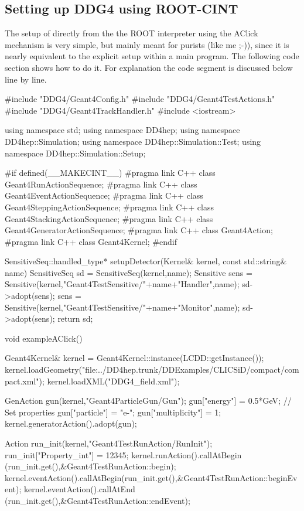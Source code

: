 \documentclass[10pt,a4paper]{article}
\begin{document}
\newpage
\subsection{Setting up DDG4 using ROOT-CINT}
\label{sec:ddg4-implementation-setup-root-cint}

\noindent
The setup of \DDG directly from the the ROOT interpreter using the AClick
mechanism is very simple, but mainly meant for purists (like me ;-)),
since it is nearly equivalent to the explicit setup within a  
main program.
The following code section shows how to do it. For explanation the code
segment is discussed below line by line.
\begin{code}
#include "DDG4/Geant4Config.h"
#include "DDG4/Geant4TestActions.h"
#include "DDG4/Geant4TrackHandler.h"
#include <iostream>

using namespace std;
using namespace DD4hep;
using namespace DD4hep::Simulation;
using namespace DD4hep::Simulation::Test;
using namespace DD4hep::Simulation::Setup;

#if defined(__MAKECINT__)
#pragma link C++ class Geant4RunActionSequence;
#pragma link C++ class Geant4EventActionSequence;
#pragma link C++ class Geant4SteppingActionSequence;
#pragma link C++ class Geant4StackingActionSequence;
#pragma link C++ class Geant4GeneratorActionSequence;
#pragma link C++ class Geant4Action;
#pragma link C++ class Geant4Kernel;
#endif

SensitiveSeq::handled_type* setupDetector(Kernel& kernel, const std::string& name)   {
  SensitiveSeq sd = SensitiveSeq(kernel,name);
  Sensitive  sens = Sensitive(kernel,"Geant4TestSensitive/"+name+"Handler",name);
  sd->adopt(sens);
  sens = Sensitive(kernel,"Geant4TestSensitive/"+name+"Monitor",name);
  sd->adopt(sens);
  return sd;
}

void exampleAClick()  {
  Geant4Kernel& kernel = Geant4Kernel::instance(LCDD::getInstance());
  kernel.loadGeometry("file:../DD4hep.trunk/DDExamples/CLICSiD/compact/compact.xml");
  kernel.loadXML("DDG4_field.xml");

  GenAction gun(kernel,"Geant4ParticleGun/Gun");
  gun["energy"] = 0.5*GeV;                          // Set properties
  gun["particle"] = "e-";
  gun["multiplicity"] = 1;
  kernel.generatorAction().adopt(gun);

  Action run_init(kernel,"Geant4TestRunAction/RunInit");
  run_init["Property_int"] = 12345;
  kernel.runAction().callAtBegin  (run_init.get(),&Geant4TestRunAction::begin);
  kernel.eventAction().callAtBegin(run_init.get(),&Geant4TestRunAction::beginEvent);
  kernel.eventAction().callAtEnd  (run_init.get(),&Geant4TestRunAction::endEvent);

}
\end{code}
\end{document}
